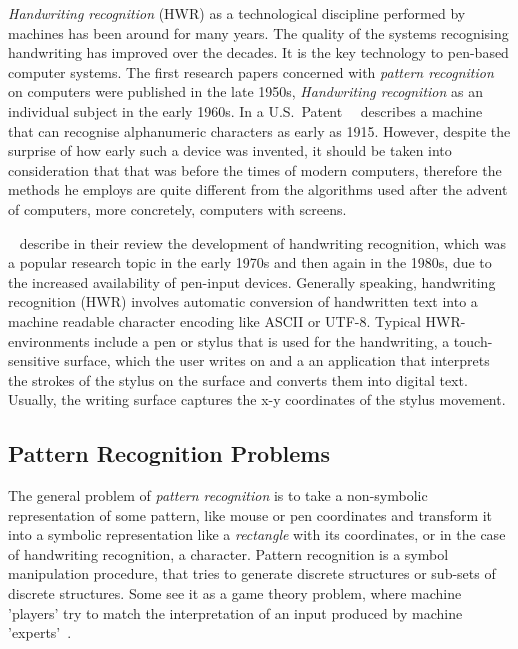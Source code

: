\emph{Handwriting recognition} (HWR) as a technological discipline performed 
by machines has been around for many years. The quality of the systems 
recognising handwriting has improved over the decades. It is the key 
technology to pen-based computer systems. The first research papers 
concerned with \emph{pattern recognition} on computers were published 
in the late 1950s, \emph{Handwriting recognition} as an individual subject in 
the early 1960s. In a U.S.\ Patent~~\citeyear{Goldberg1915} describes 
a machine that can recognise alphanumeric characters as early as 1915. 
However, despite the surprise of how early such a device was invented,
it should be taken into consideration that that was before the times 
of modern computers, therefore the methods he employs are quite different 
from the algorithms used after the advent of computers, more concretely, 
computers with screens. 

~\citeyear{Tappert1990} describe in their review the development of 
handwriting recognition, which was a popular research topic in the early 
1970s and then again in the 1980s, due to the increased availability 
of pen-input devices. Generally speaking, handwriting recognition (HWR) 
involves automatic conversion of handwritten text into a machine readable 
character encoding like ASCII or UTF-8. Typical HWR-environments include 
a pen or stylus that is used for the handwriting, a touch-sensitive surface, 
which the user writes on and a an application that interprets the strokes 
of the stylus on the surface and converts them into digital text. 
Usually, the writing surface captures the x-y coordinates of the stylus 
movement.

\subsection{Pattern Recognition Problems}
\label{sec:patternrecognitionproblems}


The general problem of \emph{pattern recognition} is to take a non-symbolic 
representation of some pattern, like mouse or pen coordinates and transform
it into a symbolic representation like a \emph{rectangle} with its coordinates,
or in the case of handwriting recognition, a character. Pattern recognition is 
a symbol manipulation procedure, that tries to generate discrete structures or 
sub-sets of discrete structures. Some see it as a game theory problem, 
where machine 'players' try to match the interpretation of an input produced 
by machine 'experts'~.

